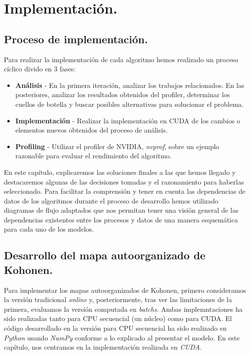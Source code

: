 \chapter{Implementación.}

\section{Proceso de implementación.}
Para realizar la implementación de cada algoritmo hemos realizado un proceso cíclico divido en 3 fases:

\begin{itemize}
	\item \textbf{Análisis} - En la primera iteración, analizar los trabajos relacionados. En las posteriores, analizar los resultados obtenidos del profiler, determinar los cuellos de botella y buscar posibles alternativas para solucionar el problema.
	\item \textbf{Implementación} - Realizar la implementación en CUDA de los cambios o elementos nuevos obtenidos del proceso de análisis.
	\item \textbf{Profiling} - Utilizar el profiler de NVIDIA, \textit{nvprof}, sobre un ejemplo razonable para evaluar el rendimiento del algoritmo.
\end{itemize}

En este capítulo, explicaremos las soluciones finales a las que hemos llegado y destacaremos algunas de las decisiones tomadas y el razonamiento para haberlas seleccionado. Para facilitar la comprensión y tener en cuenta las dependencias de datos de los algoritmos durante el proceso de desarrollo hemos utilizado diagramas de flujo adaptados que nos permitan tener una visión general de las dependencias existentes entre los procesos y datos de una manera esquemática para cada uno de los modelos. 

\section{Desarrollo del mapa autoorganizado de Kohonen.}
Para implementar los mapas autoorganizados de Kohonen, primero consideramos la versión tradicional \textit{online} y, posteriormente, tras ver las limitaciones de la primera, evaluamos la versión computada en \textit{batchs}. Ambas implemntaciones ha sido realizadas tanto para CPU secuencial (un núcleo) como para CUDA. El código desarrollado en la versión para CPU secuencial ha sido realizado en \textit{Python} usando \textit{NumPy} conforme a lo explicado al presentar el modelo. En este capítulo, nos centramos en la implementación realizada en \textit{CUDA}.

